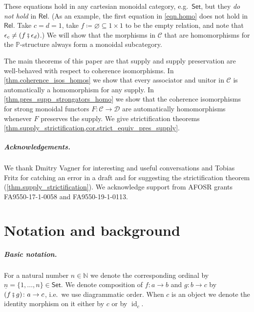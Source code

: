 \documentclass[11pt, oneside, article]{memoir}
\theoremstyle{plain}
\theoremstyle{definition}
\theoremstyle{remark}
\newcommand{\ord}[1]{\underline{#1}}%
\newcommand{\cat}[1]{\mathcal{#1}}%
\newcommand{\Cat}[1]{{\mathsf{#1}}}%
\DeclareMathOperator{\id}{id}
\newcommand{\smset}{\Cat{Set}}
\newcommand{\nn}{\mathbb{N}}
\newcommand{\pp}{\mathbb{P}}
\newcommand{\rel}{\Cat{Rel}}
\newcommand{\cp}{\mathbin{\fatsemi}}
\renewcommand{\ss}{\subseteq}
\begin{document}
These equations hold in any cartesian monoidal category, e.g.\ $\smset$, but they \emph{do not hold} in $\rel$. (As an example, the first equation in \eqref{eqn.homo} does not hold in $\rel$. Take $c=d=1$, take $f\coloneqq\varnothing\ss 1\times 1$ to be the empty relation, and note that $\epsilon_c \neq (f\cp\epsilon_d)$.) We will show that the morphisms in $\cat{C}$ that are homomorphisms for the $\pp$-structure always form a monoidal subcategory.

The main theorems of this paper are that supply and supply preservation are well-behaved with respect to coherence isomorphisms. In \cref{thm.coherence_isos_homos} we show that every associator and unitor in $\cat{C}$ is automatically a homomorphism for any supply. In \cref{thm.pres_supp_strongators_homo} we show that the coherence isomorphisms for strong monoidal functors $F\colon\cat{C}\to\cat{D}$ are automatically homomorphisms whenever $F$ preserves the supply. We give strictification theorems \cref{thm.supply_strictification,cor.strict_equiv_pres_supply}.
 
\paragraph{Acknowledgements.}
We thank Dmitry Vagner for interesting and useful conversations and Tobias Fritz for catching an error in a draft and for suggesting the strictification theorem (\cref{thm.supply_strictification}). We acknowledge support from AFOSR grants FA9550-17-1-0058 and FA9550-19-1-0113.


\chapter{Notation and background}

\paragraph{Basic notation.}
For a natural number $n\in\nn$ we denote the corresponding ordinal by $\ord{n}=\{1,\ldots,n\}\in\smset$. %
We denote composition of $f\colon a\to b$ and $g\colon b\to c$ by $(f\cp g)\colon a\to c$, i.e.\ we use diagrammatic order. When $c$ is an object we denote the identity morphism on it either by $c$ or by $\id_c$.

\end{document}

